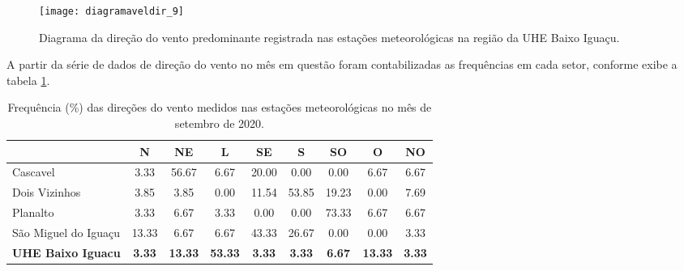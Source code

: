\documentclass[a4paper,12pt]{article}
\begin{document}
    \begin{figure}[!htb]
    \texttt{[image: diagramaveldir\_9]}
    \caption{Diagrama da direção do vento predominante registrada nas estações meteorológicas na região da UHE Baixo Iguaçu.}
    \label{fig:figdir}
    \end{figure}
    
    A partir da série de dados de direção do vento no mês em questão foram contabilizadas as frequências em cada setor, conforme exibe a 
    tabela \ref{tab:tabdir}.

    \begin{table}[!hbt]
    \begin{center}
    \caption{Frequência (\%) das direções do vento medidos nas estações meteorológicas no mês de setembro de 2020.}
    \label{tab:tabdir}
    \begin{tabular}{lcccccccc}
    \hline
             &        N      &        NE     &        L      &        SE     &        S     &        SO     &        O    &        NO  \\
    \hline                                                                                                                            
    Cascavel       &        3.33     &        56.67     &        6.67     &        20.00     &        0.00    &        0.00     &        6.67   &        6.67   \\
    Dois Vizinhos       &        3.85     &        3.85     &        0.00     &        11.54     &        53.85    &        19.23     &        0.00   &        7.69   \\
    Planalto       &        3.33     &        6.67     &        3.33     &        0.00     &        0.00    &        73.33     &        6.67   &        6.67   \\
    São Miguel do Iguaçu       &        13.33     &        6.67     &        6.67     &        43.33     &        26.67    &        0.00     &        0.00   &        3.33   \\
    \textbf{UHE Baixo Iguacu}       &        \textbf{3.33}     &        \textbf{13.33}     &        \textbf{53.33}     &        \textbf{3.33}     &        \textbf{3.33}    &        \textbf{6.67}     &        \textbf{13.33}   &        \textbf{3.33}   \\

    \hline          
    \end{tabular}
    \end{center}
    \end{table}
\end{document}
